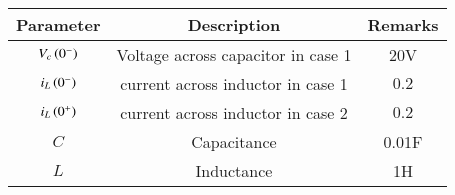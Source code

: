 \setlength{\arrayrulewidth}{0.3mm}
\setlength{\tabcolsep}{20pt}
\renewcommand{\arraystretch}{1.3}



\begin{tabular}{|c|c|c|}
\hline

Parameter& Description & Remarks\\
\hline
$V_c\left(0^{-}\right)$ & Voltage across capacitor in case 1 & 20V\\
\hline
$i_L \left(0^-\right)$ & current across inductor in case 1  & $0.2 $  \\
\hline
$i_L \left(0^+\right)$ & current across inductor in case 2 & $0.2 $\\
\hline
$C$ & Capacitance & 0.01F\\
\hline
$L$ & Inductance & 1H\\
\hline

\end{tabular}


